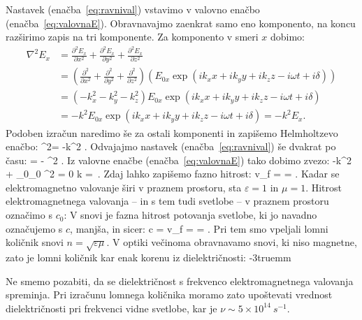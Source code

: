 Nastavek 
(enačba~\ref{eq:ravnival}) vstavimo v valovno enačbo (enačba~\ref{eq:valovnaE}). 
Obravnavajmo zaenkrat samo eno komponento, na koncu razširimo zapis na tri komponente. 
Za komponento v smeri $x$ dobimo:
\begin{align}
\nabla^2E_x &= \frac{\partial^2E_x}{\partial x^2} + \frac{\partial^2E_x}{\partial y^2} + 
\frac{\partial^2E_x}{\partial z^2} \nonumber \\
&= \left(\frac{\partial^2}{\partial x^2} + 
\frac{\partial^2}{\partial y^2} + \frac{\partial^2}{\partial z^2}\right) \left(
E_{0x} \exp\left( ik_xx+ik_yy+ik_zz -i\omega t + i\delta\right) \right)\nonumber \\
&= \left( -k_x^2 -k_y^2-k_z^2\right) E_{0x} \exp\left( ik_xx+ik_yy+ik_zz -i\omega t + i\delta\right)\nonumber \\
&= -k^2 E_{0x} \exp\left( ik_xx+ik_yy+ik_zz -i\omega t + i\delta\right) = -k^2 E_x.
\label{eq:03_11}
\end{align}
Podoben izračun naredimo še za ostali komponenti in zapišemo Helmholtzevo enačbo:
\beq
\nabla^2= -k^2 .
\label{eq:03_12}
\eeq
Odvajajmo nastavek (enačba~\ref{eq:ravnival}) še dvakrat po času:
\beq
{} = - \omega^2 .
\label{eq:03_13}
\eeq
Iz valovne enačbe (enačba~\ref{eq:valovnaE}) tako dobimo zvezo:
\beq
-k^2  + \varepsilon\varepsilon_0\mu\mu_0 \omega^2  = 0
\quad \Longrightarrow \quad
k = \,\omega.
\label{eq:03_15}
\eeq
Zdaj lahko zapišemo fazno hitrost:
\beq
v_f =  = .
\label{eq:fazna}
\eeq
Kadar se elektromagnetno valovanje širi v praznem prostoru, sta $\varepsilon = 1$ in $\mu=1$. 
Hitrost elektromagnetnega valovanja -- in s tem tudi svetlobe -- v praznem prostoru označimo s $c_0$:
V snovi je fazna hitrost potovanja svetlobe, ki jo navadno označujemo s $c$, manjša, in sicer:
\beq
c = v_f =  = .
\label{eq:03_16}
\eeq
Pri tem smo vpeljali lomni količnik snovi $n = \sqrt{\varepsilon\mu}$. 
V optiki večinoma obravnavamo snovi, ki niso magnetne, zato je lomni količnik kar
enak korenu iz dielektričnosti:
\vglue-3truemm
\begin{remark}
Ne smemo pozabiti, da se dielektričnost s frekvenco elektromagnetnega 
valovanja spreminja. Pri izračunu lomnega količnika moramo zato upoštevati vrednost
dielektričnosti pri  frekvenci vidne svetlobe, kar je $\nu \sim 5 \times 10^{14}~\si{s}^{-1}$. 
\end{remark}

